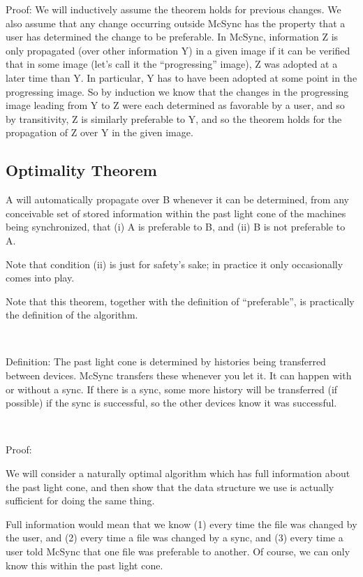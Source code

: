 \documentclass{book}
\begin{document}
Proof:  We will inductively assume the theorem holds for previous changes.  We also assume that any change occurring outside McSync has the property that a user has determined the change to be preferable.  In McSync, information Z is only propagated (over other information Y) in a given image if it can be verified that in some image (let's call it the ``progressing'' image), Z was adopted at a later time than Y.  In particular, Y has to have been adopted at some point in the progressing image.  So by induction we know that the changes in the progressing image leading from Y to Z were each determined as favorable by a user, and so by transitivity, Z is similarly preferable to Y, and so the theorem holds for the propagation of Z over Y in the given image.



\subsection{Optimality Theorem}

A will automatically propagate over B whenever it can be determined, from any conceivable set of stored information within the past light cone of the machines being synchronized, that (i) A is preferable to B, and (ii) B is not preferable to A.

Note that condition (ii) is just for safety's sake; in practice it only occasionally comes into play.

Note that this theorem, together with the definition of ``preferable'', is practically the definition of the algorithm.

~

Definition:  The past light cone is determined by histories being transferred between devices.  McSync transfers these whenever you let it.  It can happen with or without a sync.  If there is a sync, some more history will be transferred (if possible) if the sync is successful, so the other devices know it was successful.

~

Proof:

We will consider a naturally optimal algorithm which has full information about the past light cone, and then show that the data structure we use is actually sufficient for doing the same thing.

Full information would mean that we know (1) every time the file was changed by the user, and (2) every time a file was changed by a sync, and (3) every time a user told McSync that one file was preferable to another.  Of course, we can only know this within the past light cone.
\end{document}
